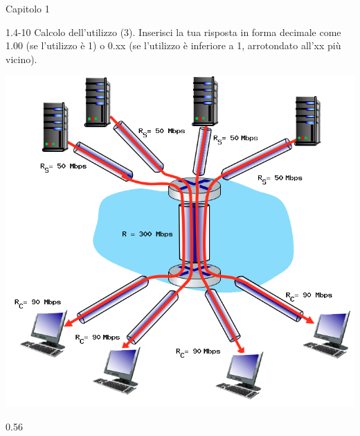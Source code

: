 \documentclass[a4paper]{article}
\begin{document}
\begin{quiz}{Capitolo 1}
\begin{shortanswer}[points=1]{1.4-10 Calcolo dell'utilizzo (3).}
Inserisci la tua risposta in forma decimale come 1.00 (se l'utilizzo è 1) o 0.xx (se l'utilizzo è inferiore a 1, arrotondato all'xx più vicino).

\begin{center}
\includegraphics[width=\linewidth]{figs/1.4.7.png}
\end{center}
\item* 0.56
\end{shortanswer}
    
\end{quiz}
\end{document}
